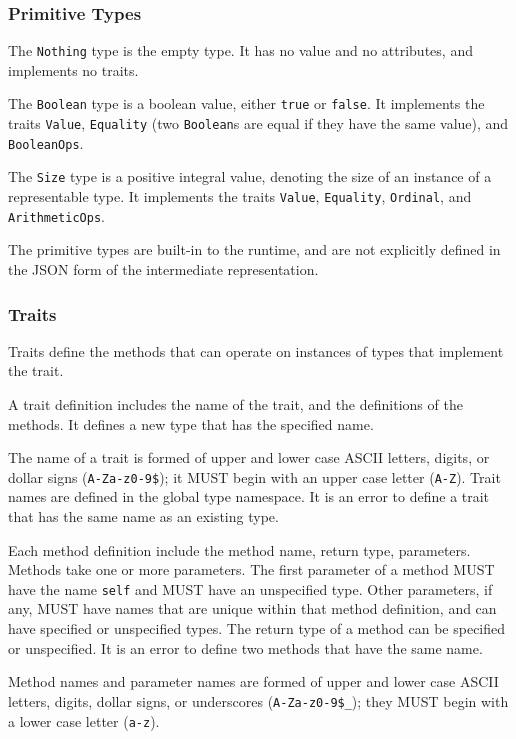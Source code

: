 \documentclass[10pt,twocolumn,a4paper]{article}
\newcommand{\code}[1]{\texttt{#1}}
\begin{document}
\subsubsection{Primitive Types}
\label{sec:primitives}

The \code{Nothing} type is the empty type. It has no value and no attributes,
and implements no traits.

The \code{Boolean} type is a boolean value, either \code{true} or \code{false}.
It implements the traits \code{Value}, \code{Equality} (two \code{Boolean}s are equal if
they have the same value), and \code{BooleanOps}.

The \code{Size} type is a positive integral value, denoting the size of an
instance of a representable type. It implements the traits \code{Value},
\code{Equality}, \code{Ordinal}, and \code{ArithmeticOps}.

The primitive types are built-in to the runtime, and are not explicitly
defined in the JSON form of the intermediate representation.

\subsubsection{Traits}
\label{sec:traits}

Traits define the methods that can operate on instances of types that
implement the trait.

A trait definition includes the name of the trait, and the definitions
of the methods. It defines a new type that has the specified name.

The name of a trait is formed of upper and lower case ASCII letters,
digits, or dollar signs (\code{A-Za-z0-9\$}); it MUST begin with an
upper case letter (\code{A-Z}). Trait names are defined in the global type
namespace.  It is an error to define a trait that has the same name as an
existing type.

Each method definition include the method name, return type, parameters.
Methods take one or more parameters.
The first parameter of a method MUST have the name \code{self} and MUST
have an unspecified type.
Other parameters, if any, MUST have names that are unique within that
method definition, and can have specified or unspecified types.
The return type of a method can be specified or unspecified.  
It is an error to define two methods that have the same name.

Method names and parameter names are formed of upper and lower case ASCII
letters, digits, dollar signs, or underscores (\code{A-Za-z0-9\$\_});
they MUST begin with a lower case letter (\code{a-z}).
\end{document}
